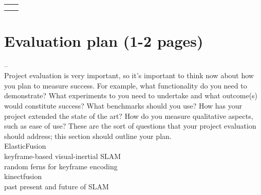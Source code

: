 \documentclass[12pt,twoside]{article}
\begin{document}
\begin{table}[]
\begin{tabular}{ll}
                            &                                                                                                                                                                                                                                                                                                                                                                      \\
                            &                                                                                                                                                                                                                                                                                                                                                                     
\end{tabular}
\end{table}

\section{Evaluation plan (1-2 pages)}

--\\
Project evaluation is very important, so it's important to think now about how you plan to measure success. For example, what functionality do you need to demonstrate?  What experiments to you need to undertake and what outcome(s) would constitute success?  What benchmarks should you use? How has your project extended the state of the art?  How do you measure qualitative aspects, such as ease of use?  These are the sort of questions that your project evaluation should address; this section should outline your plan.\\

\newpage
ElasticFusion \cite{whelan2015elasticfusion}\\
keyframe-based visual-inertial SLAM \cite{leutenegger2015keyframe}\\
random ferns for keyframe encoding \cite{glocker2015real}\\
kinectfusion \cite{newcombe2011kinectfusion}\\
past present and future of SLAM \cite{cadena2016past}\\



\end{document}
